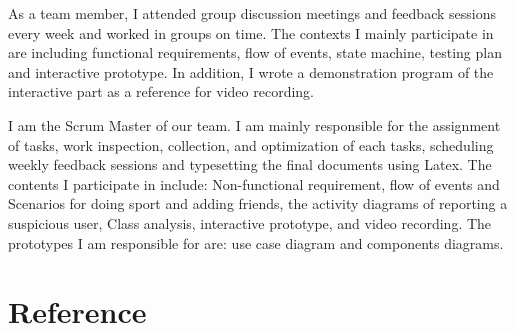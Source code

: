 \documentclass[a4paper]{article}
\begin{document}
	\par
	As a team member, I attended group discussion meetings and feedback sessions every week and worked in groups on time. The contexts I mainly participate in are including functional requirements, flow of events, state machine, testing plan and interactive prototype. In addition, I wrote a demonstration program of the interactive part as a reference for video recording.\\

	\par
	I am the Scrum Master of our team. I am mainly responsible for the assignment of tasks, work inspection, collection, and optimization of each tasks, scheduling weekly feedback sessions and typesetting the final documents using Latex. The contents I participate in include: Non-functional requirement, flow of events and Scenarios for doing sport and adding friends, the activity diagrams of reporting a suspicious user, Class analysis, interactive prototype, and video recording. The prototypes I am responsible for are: use case diagram and components diagrams.

	\section{Reference}
\end{document}
